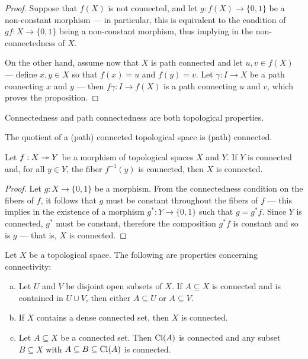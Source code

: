 \begin{proof}
Suppose that \(f(X)\) is not connected, and let \(g: f(X) \to \{0, 1\}\) be a
non-constant morphism --- in particular, this is equivalent to the condition of
\(gf: X \to \{0, 1\}\) being a non-constant morphism, thus implying in the
non-connectedness of \(X\).

On the other hand, assume now that \(X\) is path connected and let
\(u, v \in f(X)\) --- define \(x, y \in X\) so that \(f(x) = u\) and
\(f(y) = v\). Let \(\gamma: I \to X\) be a path connecting \(x\) and \(y\) ---
then \(f\gamma: I \to f(X)\) is a path connecting \(u\) and \(v\), which proves
the proposition.
\end{proof}

\begin{corollary}
\label{cor:connectedness-top-property}
Connectedness and path connectedness are both topological properties.
\end{corollary}

\begin{corollary}
\label{cor:quotient-path-connected-is-path-connected}
The quotient of a (path) connected topological space is (path) connected.
\end{corollary}

\begin{proposition}
\label{prop:connectivity-quotients}
Let \(f: X \twoheadrightarrow Y\) be a morphism of topological spaces \(X\) and \(Y\). If
\(Y\) is connected and, for all \(y \in Y\), the fiber \(f^{-1}(y)\) is
connected, then \(X\) is connected.
\end{proposition}

\begin{proof}
Let \(g: X \to \{0, 1\}\) be a morphism. From the connectedness condition on the
fibers of \(f\), it follows that \(g\) must be constant throughout the fibers of
\(f\) --- this implies in the existence of a morphism \(g^{*}: Y \to \{0, 1\}\)
such that \(g = g^{*} f\). Since \(Y\) is connected, \(g^{*}\) must be constant,
therefore the composition \(g^{*} f\) is constant and so is \(g\) --- that is,
\(X\) is connected.
\end{proof}

\begin{proposition}
\label{prop:properties-connectivity}
Let \(X\) be a topological space. The following are properties concerning
connectivity:
\begin{enumerate}[(a)]\setlength\itemsep{0em}
\item Let \(U\) and \(V\) be disjoint open subsets of \(X\). If
  \(A \subseteq X\) is connected and is contained in \(U \cup V\), then either
  \(A \subseteq U\) or \(A \subseteq V\).

\item If \(X\) contains a dense connected set, then \(X\) is connected.

\item Let \(A \subseteq X\) be a connected set. Then \(\operatorname{Cl}(A)\) is connected and
  any subset \(B \subseteq X\) with \(A \subseteq B \subseteq \operatorname{Cl}(A)\) is
  connected.
\end{enumerate}
\end{proposition}

